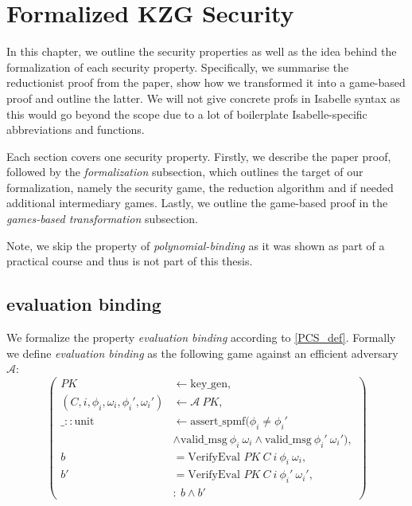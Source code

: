 \chapter{Formalized KZG Security}\label{chapter:security}
In this chapter, we outline the security properties as well as the idea behind the formalization of each security property. Specifically, we summarise the reductionist proof from the paper, show how we transformed it into a game-based proof and outline the latter. We will not give concrete profs in Isabelle syntax as this would go beyond the scope due to a lot of boilerplate Isabelle-specific abbreviations and functions.

Each section covers one security property. Firstly, we describe the paper proof, followed by the \textit{formalization} subsection, which outlines the target of our formalization, namely the security game, the reduction algorithm and if needed additional intermediary games. Lastly, we outline the game-based proof in the \textit{games-based transformation} subsection.

Note, we skip the property of \textit{polynomial-binding} as it was shown as part of a practical course and thus is not part of this thesis.

\section{evaluation binding}
We formalize the property \textit{evaluation binding} according to \ref{PCS_def}. Formally we define \textit{evaluation binding} as the following game against an efficient adversary $\mathcal{A}$: 
\begin{equation*}
    \left(
        \begin{aligned}
            PK & \leftarrow \text{key\_gen}, \\
            (C, i,\phi_i,\omega_i, \phi_i',\omega_i') & \leftarrow \mathcal{A} \ PK, \\
            \_::\text{unit} & \leftarrow \text{assert\_spmf}(\phi_i \ne \phi_i' \\
            &\land \text{valid\_msg}\ \phi_i\ \omega_i \land \text{valid\_msg}\ \phi_i'\ \omega_i'), \\
            b &= \text{VerifyEval } PK\ C\ i\ \phi_i\ \omega_i,\\
            b' &= \text{VerifyEval } PK\ C\ i\ \phi_i'\ \omega_i',\\
            & : \ b \land b'
        \end{aligned}
        \right)
\end{equation*}

